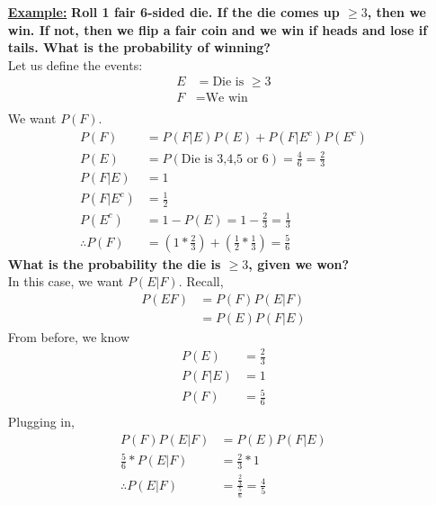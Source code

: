 \documentclass[10pt]{article}
\begin{document}
\begin{flushleft}
    \begin{itemize}
\item[\textbf{\underline{Example:}}] \textbf{Roll 1 fair 6-sided die. If the die
    comes up $\geq 3$, then we win. If not, then we flip a fair coin and we win
if heads and lose if tails. What is the probability of winning?} \\
    Let us define the events:
        $$ \begin{aligned}
            E &= \text{Die is } \geq 3\\
            F &= \text{We win}\\
        \end{aligned} $$
        We want $P(F)$.
        $$ \begin{aligned}
            P(F) &= P(F|E)P(E) + P(F|E^c)P(E^c) \\
            P(E) &= P(\text{Die is 3,4,5 or 6}) = \frac{4}{6} = \frac{2}{3} \\
            P(F|E) &= 1 \\
            P(F|E^c) &= \frac{1}{2}\\
            P(E^c) &= 1 - P(E) = 1 - \frac{2}{3} = \frac{1}{3} \\
            \therefore P(F) &= (1 * \frac{2}{3}) + (\frac{1}{2} * \frac{1}{3}) =
            \frac{5}{6}
        \end{aligned}$$
        \textbf{What is the probability the die is $\geq 3$, given we won?} \\
        In this case, we want $P(E|F)$. Recall,
        $$ \begin{aligned}
            P(EF) &= P(F)P(E|F) \\
                  &= P(E)P(F|E)
        \end{aligned}$$
        From before, we know
        $$ \begin{aligned}
            P(E) &= \frac{2}{3} \\
            P(F|E) &= 1 \\
            P(F) &= \frac{5}{6} \\
        \end{aligned}$$
        Plugging in,
        $$ \begin{aligned} 
            P(F)P(E|F) &= P(E)P(F|E) \\
            \frac{5}{6} * P(E|F) &= \frac{2}{3} * 1 \\
            \therefore P(E|F) &= \frac{\frac{2}{3}}{\frac{5}{6}} = \frac{4}{5}
        \end{aligned}$$


\end{itemize}
\end{flushleft}
\end{document}
